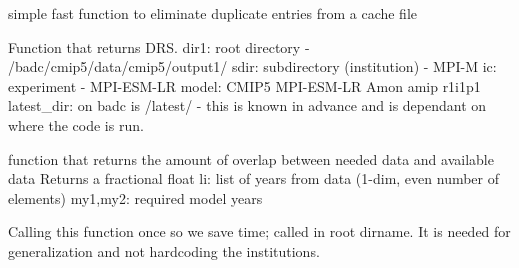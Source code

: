 \documentclass[letterpaper,10pt,english]{sphinxmanual}
\begin{document}

\begin{fulllineitems}
\label{\detokenize{index:cmip5datafinder.fix_duplicate_entries}}
simple fast function to eliminate duplicate entries
from a cache file

\end{fulllineitems}


\begin{fulllineitems}
\label{\detokenize{index:cmip5datafinder.get_drs}}
Function that returns DRS.
dir1: root directory - /badc/cmip5/data/cmip5/output1/
sdir: subdirectory (institution) - MPI-M
ic: experiment - MPI-ESM-LR
model: CMIP5 MPI-ESM-LR Amon amip r1i1p1
latest\_dir: on badc is /latest/ - this is known in advance
and is dependant on where the code is run.

\end{fulllineitems}


\begin{fulllineitems}
\label{\detokenize{index:cmip5datafinder.get_overlap}}
function that returns the amount of overlap
between needed data and available data
Returns a fractional float
li: list of years from data (1-dim, even number of elements)
my1,my2: required model years

\end{fulllineitems}


\begin{fulllineitems}
\label{\detokenize{index:cmip5datafinder.lsladir}}
Calling this function once so we save time; called in root dirname.
It is needed for generalization and not hardcoding the institutions.

\end{fulllineitems}
\end{document}

